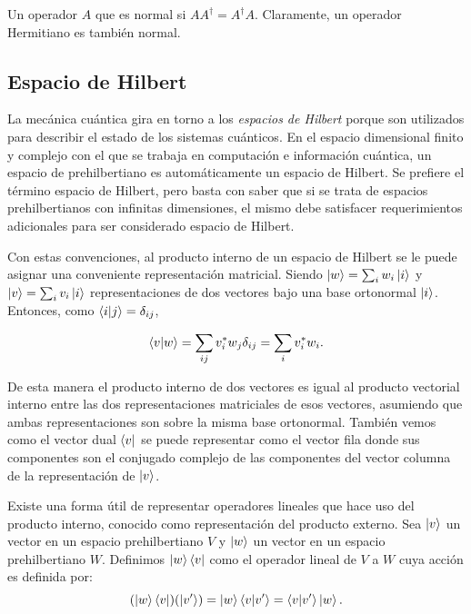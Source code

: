 \begin{definicion}
Un operador $A$ que es normal si $AA^\dagger = A^\dagger A$. Claramente, un operador Hermitiano es también normal. 
\end{definicion}

\subsection{Espacio de Hilbert}\label{sub:hilbert}

La mecánica cuántica gira en torno a los \emph{espacios de Hilbert} porque son utilizados para describir el estado de los sistemas cuánticos. En el espacio dimensional finito y complejo con el que se trabaja en computación e información cuántica, un espacio de prehilbertiano es automáticamente un espacio de Hilbert. Se prefiere el término espacio de Hilbert, pero basta con saber que si se trata de espacios prehilbertianos con infinitas dimensiones, el mismo debe satisfacer requerimientos adicionales para ser considerado espacio de Hilbert.



Con estas convenciones, al producto interno de un espacio de Hilbert se le puede asignar una conveniente representación matricial. Siendo $\ket{w} = \sum_i w_i\ket{i}$ y $\ket{v} = \sum_i v_i\ket{i}$ representaciones de dos vectores bajo una base ortonormal $\ket{i}$. Entonces, como $\braket{i|j} = \delta_{ij}$,

\begin{equation}
    \braket{v|w} = \sum_{ij} v_i^* w_j \delta_{ij}  = \sum_i v_i^* w_i.
\end{equation}

De esta manera el producto interno de dos vectores es igual al producto vectorial interno entre las dos representaciones matriciales de esos vectores, asumiendo que ambas representaciones son sobre la misma base ortonormal. También vemos como el vector dual $\bra{v}$ se puede representar como el vector fila donde sus componentes son el conjugado complejo de las componentes del vector columna de la representación de $\ket{v}$.

Existe una forma útil de representar operadores lineales que hace uso del producto interno, conocido como representación del producto externo. Sea $\ket{v}$ un vector en un espacio prehilbertiano $V$ y $\ket{w}$ un vector en un espacio prehilbertiano $W$. Definimos $\ket{w}\bra{v}$ como el operador lineal de $V$ a $W$ cuya acción es definida por:
\begin{equation}
    (\ket{w}\bra{v}) (\ket{v'}) = \ket{w} \braket{v|v'} = \braket{v|v'} \ket{w}.
\end{equation}

